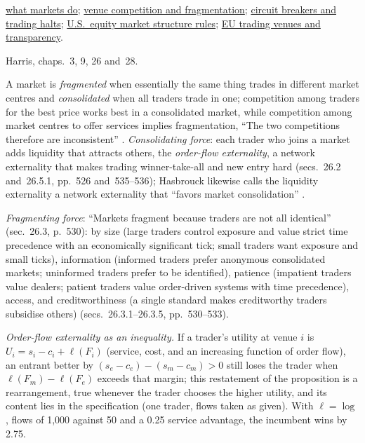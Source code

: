 \begin{qfdefinition}
 \hyperref[def:market-functions]{what markets do}; \hyperref[mech:venue-competition-fragmentation]{venue competition and fragmentation}; \hyperref[mech:circuit-breakers-trading-halts]{circuit breakers and trading halts}; \hyperref[rule:us-equity-market-structure]{U.S.\ equity market structure rules}; \hyperref[rule:eu-trading-venue-transparency]{EU trading venues and transparency}.

 Harris, chaps.~3, 9, 26 and~28.

\end{qfdefinition}

\begin{qfmechanism}\label{mech:venue-competition-fragmentation}
 A market is \emph{fragmented} when essentially the same thing trades in different market centres and \emph{consolidated} when all traders trade in one; competition among traders for the best price works best in a consolidated market, while competition among market centres to offer services implies fragmentation, ``The two competitions therefore are inconsistent'' \citep[chap.~26, p.~524]{alpha-harris}. \emph{Consolidating force}: each trader who joins a market adds liquidity that attracts others, the \emph{order-flow externality}, a network externality that makes trading winner-take-all and new entry hard (secs.~26.2 and~26.5.1, pp.~526 and~535--536); Hasbrouck likewise calls the liquidity externality a network externality that ``favors market consolidation'' \citep[chap.~1, sec.~1.2, p.~5]{s6-hasbrouck}.

\emph{Fragmenting force}: ``Markets fragment because traders are not all identical'' (sec.~26.3, p.~530): by size (large traders control exposure and value strict time precedence with an economically significant tick; small traders want exposure and small ticks), information (informed traders prefer anonymous consolidated markets; uninformed traders prefer to be identified), patience (impatient traders value dealers; patient traders value order-driven systems with time precedence), access, and creditworthiness (a single standard makes creditworthy traders subsidise others) (secs.~26.3.1--26.3.5, pp.~530--533).

 \emph{Order-flow externality as an inequality.} If a trader's utility at venue $i$ is $U_i=s_i-c_i+\ell(F_i)$ (service, cost, and an increasing function of order flow), an entrant better by $(s_e-c_e)-(s_m-c_m)>0$ still loses the trader when $\ell(F_m)-\ell(F_e)$ exceeds that margin; this restatement of the proposition is a rearrangement, true whenever the trader chooses the higher utility, and its content lies in the specification (one trader, flows taken as given). With $\ell=\log$, flows of 1{,}000 against 50 and a 0.25 service advantage, the incumbent wins by 2.75.


\end{qfmechanism}
